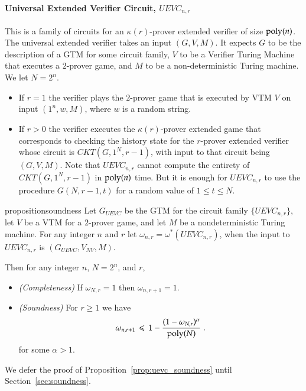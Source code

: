 \paragraph{Universal Extended Verifier Circuit, $UEVC_{n,r}$} This is a family of circuits for an $\kappa(r)$-prover extended verifier of size $\operatorname{poly}(n)$. The universal extended verifier takes an input $(G,V,M)$. It expects $G$ to be the description of a GTM for some circuit family, $V$ to be a Verifier Turing Machine that executes a $2$-prover game, and $M$ to be a non-deterministic Turing machine. %
We let $N = 2^n$.
\begin{itemize}
\item If $r=1$ the verifier plays the $2$-prover game that is executed by VTM $V$ on input $(1^n,w,M)$, where $w$ is a random string.

\item If $r>0$ the verifier executes the $\kappa(r)$-prover extended game that corresponds to checking the history state for the $r$-prover extended verifier whose circuit is $CKT(G,1^N,r-1)$, with input to that circuit being $(G,V,M)$. Note that $UEVC_{n,r}$ cannot compute the entirety of $CKT(G,1^N,r-1)$ in $\operatorname{poly}(n)$ time. But it is enough for $UEVC_{n,r}$ to use the procedure $G(N,r-1,t)$ for a random value of $1\leq t\leq N$.
\end{itemize}

\begin{restatable}{proposition}{soundness}
	Let $G_{UEVC}$ be the GTM for the circuit family $\{UEVC_{n,r}\}$, let $V$ be a VTM for a $2$-prover game, and let $M$ be a nondeterministic Turing machine. For any integer $n$ and $r$ let $\omega_{n,r} = \omega^*(UEVC_{n,r})$, when the input to $UEVC_{n,r}$ is $(G_{UEVC},V_{NV},M)$. 
	
	Then for any integer $n$, $N=2^n$, and $r$,
	\begin{itemize}
	\item \emph{(Completeness)} If $\omega_{N,r}=1$ then $\omega_{n,r+1}=1$.
	\item \emph{(Soundness)} For $r \geq 1$ we have
	\[
		\omega_{n,r+1} \,\leqslant\, 1 - \frac{(1 - \omega_{N,r})^\alpha}{\operatorname{poly}(N)}\;.
	\]
	for some $\alpha > 1$.
	\end{itemize}
	\label{prop:uevc_soundness}
\end{restatable}

We defer the proof of Proposition~\ref{prop:uevc_soundness} until Section~\ref{sec:soundness}. 


